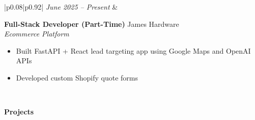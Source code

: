 \documentclass[lettersized,9pt]{article}
\newcommand{\header}[1]{\textbf{\normalsize #1}\vspace{-2pt}}
\begin{document}
\begin{tabular}{|p{0.08\textwidth}|p{0.92\textwidth}|}
\textit{June 2025 -- Present} &
\parbox[t]{\linewidth}{%
  \textbf{Full-Stack Developer (Part-Time)} \dotfill James Hardware\\
  \textit{Ecommerce Platform}
  \begin{itemize}[noitemsep,topsep=0pt,leftmargin=1em]
    \item Built FastAPI + React lead targeting app using Google Maps and OpenAI APIs
    \item Developed custom Shopify quote forms
  \end{itemize}\vspace{2pt}%
}\\ \hline

\end{tabular}
\endgroup

\header{Projects}

\begingroup
\setlength{\baselineskip}{7.5pt}
\renewcommand{\arraystretch}{0.2}
\end{document}
